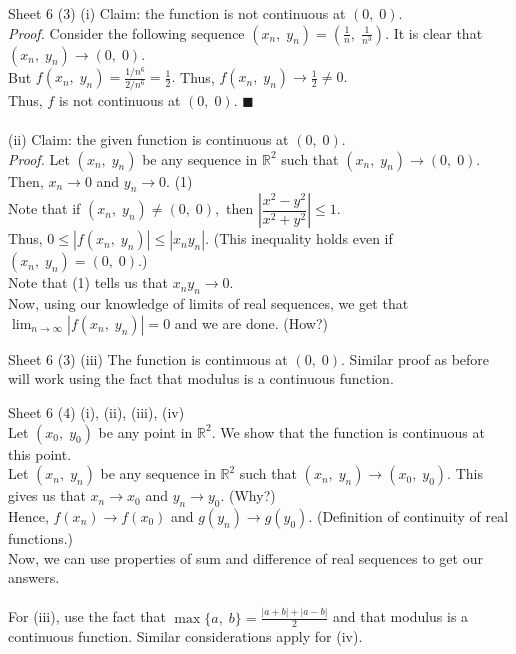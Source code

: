 \documentclass[handout, aspectratio=169]{beamer}
\begin{document}
\begin{frame}{Sheet 6}
	(3) (i) Claim: the function is not continuous at $(0,\;0).$\\
	\emph{Proof.} Consider the following sequence $(x_n,\;y_n) = \left(\frac{1}{n},\;\frac{1}{n^3}\right).$ It is clear that $(x_n,\;y_n) \to (0,\;0).$\\
	But $f(x_n,\;y_n) = \frac{1/n^6}{2/n^6} = \frac{1}{2}.$ Thus, $f(x_n,\;y_n) \to \frac{1}{2} \neq 0.$\\
	Thus, $f$ is not continuous at $(0,\;0).$ \hfill $\blacksquare$\\~\\
	(ii) Claim: the given function is continuous at $(0,\;0).$\\
	\emph{Proof.} Let $(x_n,\;y_n)$ be any sequence in $\mathbb{R}^2$ such that $(x_n,\;y_n) \to (0,\;0).$ Then, $x_n \to 0$ and $y_n \to 0.$ \hfill (1)\\
	Note that if $(x_n,\;y_n) \neq (0,\;0),$ then $\left|\dfrac{x^2 - y^2}{x^2 + y^2}\right| \le 1.$\\
	Thus, $0 \le |f(x_n,\;y_n)| \le \left|x_ny_n\right|.$ \hfill (This inequality holds even if $(x_n,\;y_n) = (0,\;0).$)\\
	Note that (1) tells us that $x_ny_n \to 0.$\\
	Now, using our knowledge of limits of real sequences, we get that $\displaystyle\lim_{n\to \infty}|f(x_n,\;y_n)| = 0$ and we are done. \hfill (How?)
\end{frame}
\begin{frame}{Sheet 6}
	(3) (iii) The function is continuous at $(0,\;0).$ Similar proof as before will work using the fact that modulus is a continuous function.
\end{frame}
\begin{frame}{Sheet 6}
	(4) (i), (ii), (iii), (iv) \\
	Let $(x_0,\;y_0)$ be any point in $\mathbb{R}^2.$ We show that the function is continuous at this point.\\
	Let $(x_n,\;y_n)$ be any sequence in $\mathbb{R}^2$ such that $(x_n,\;y_n) \to (x_0,\;y_0).$ This gives us that $x_n \to x_0$ and $y_n \to y_0.$ \hfill (Why?)\\
	Hence, $f(x_n) \to f(x_0)$ and $g(y_n) \to g(y_0).$ (Definition of continuity of real functions.)\\
	Now, we can use properties of sum and difference of real sequences to get our answers.\\~\\
	For (iii), use the fact that $\max\{a,\;b\} = \frac{|a + b| + |a - b|}{2}$ and that modulus is a continuous function. Similar considerations apply for (iv).
\end{frame}
\end{document}
